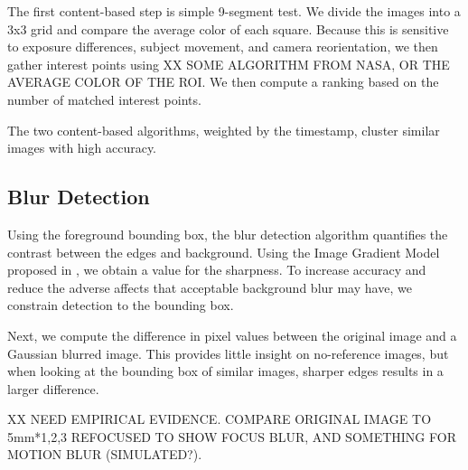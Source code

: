 \documentclass[twocolumn]{article}
\begin{document}
The first content-based step is simple 9-segment test. We divide the images into a 3x3 grid and compare the average color of each square. Because this is sensitive to exposure differences, subject movement, and camera reorientation, we then gather interest points using XX SOME ALGORITHM FROM NASA, OR THE AVERAGE COLOR OF THE ROI. We then compute a ranking based on the number of matched interest points.

The two content-based algorithms, weighted by the timestamp, cluster similar images with high accuracy.

\subsection{Blur Detection}
Using the foreground bounding box, the blur detection algorithm quantifies the contrast between the edges and background. Using the Image Gradient Model proposed in \cite{springerlink:10.1007/978-3-540-77409-9_26}, we obtain a value for the sharpness. To increase accuracy and reduce the adverse affects that acceptable background blur may have, we constrain detection to the bounding box.

Next, we compute the difference in pixel values between the original image and a Gaussian blurred image. This provides little insight on no-reference images, but when looking at the bounding box of similar images, sharper edges results in a larger difference.

XX NEED EMPIRICAL EVIDENCE. COMPARE ORIGINAL IMAGE TO 5mm*{1,2,3} REFOCUSED TO SHOW FOCUS BLUR, AND SOMETHING FOR MOTION BLUR (SIMULATED?).
\end{document}

